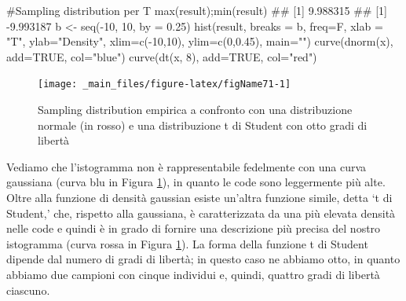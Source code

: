 \documentclass[a4paper,12pt,oneside]{book}
\newenvironment{Shaded}{\begin{snugshade}}{\end{snugshade}}
\newcommand{\DecValTok}[1]{#1}
\newcommand{\FloatTok}[1]{#1}
\newcommand{\ConstantTok}[1]{#1}
\newcommand{\SpecialCharTok}[1]{#1}
\newcommand{\StringTok}[1]{#1}
\newcommand{\CommentTok}[1]{#1}
\newcommand{\DocumentationTok}[1]{#1}
\newcommand{\OtherTok}[1]{#1}
\newcommand{\FunctionTok}[1]{#1}
\newcommand{\AttributeTok}[1]{#1}
\newcommand{\NormalTok}[1]{#1}
\begin{document}
\begin{Shaded}
\begin{Highlighting}[]
\CommentTok{\#Sampling distribution per T }
\FunctionTok{max}\NormalTok{(result);}\FunctionTok{min}\NormalTok{(result)}
\DocumentationTok{\#\# [1] 9.988315}
\DocumentationTok{\#\# [1] {-}9.993187}
\NormalTok{b }\OtherTok{\textless{}{-}} \FunctionTok{seq}\NormalTok{(}\SpecialCharTok{{-}}\DecValTok{10}\NormalTok{, }\DecValTok{10}\NormalTok{, }\AttributeTok{by =} \FloatTok{0.25}\NormalTok{)}
\FunctionTok{hist}\NormalTok{(result, }\AttributeTok{breaks =}\NormalTok{ b, }\AttributeTok{freq=}\NormalTok{F, }
  \AttributeTok{xlab =} \StringTok{"T"}\NormalTok{, }\AttributeTok{ylab=}\StringTok{"Density"}\NormalTok{, }
  \AttributeTok{xlim=}\FunctionTok{c}\NormalTok{(}\SpecialCharTok{{-}}\DecValTok{10}\NormalTok{,}\DecValTok{10}\NormalTok{), }\AttributeTok{ylim=}\FunctionTok{c}\NormalTok{(}\DecValTok{0}\NormalTok{,}\FloatTok{0.45}\NormalTok{), }\AttributeTok{main=}\StringTok{""}\NormalTok{)}
\FunctionTok{curve}\NormalTok{(}\FunctionTok{dnorm}\NormalTok{(x), }\AttributeTok{add=}\ConstantTok{TRUE}\NormalTok{, }\AttributeTok{col=}\StringTok{"blue"}\NormalTok{)}
\FunctionTok{curve}\NormalTok{(}\FunctionTok{dt}\NormalTok{(x, }\DecValTok{8}\NormalTok{), }\AttributeTok{add=}\ConstantTok{TRUE}\NormalTok{, }\AttributeTok{col=}\StringTok{"red"}\NormalTok{)}
\end{Highlighting}
\end{Shaded}

\begin{figure}

{\centering \texttt{[image: \_main\_files/figure-latex/figName71-1]} 

}

\caption{Sampling distribution empirica a confronto con una distribuzione normale (in rosso) e una distribuzione t di Student con otto gradi di libertà}\label{fig:figName71}
\end{figure}

Vediamo che l'istogramma non è rappresentabile fedelmente con una curva gaussiana (curva blu in Figura \ref{fig:figName71}), in quanto le code sono leggermente più alte. Oltre alla funzione di densità gaussian esiste un'altra funzione simile, detta `t di Student,' che, rispetto alla gaussiana, è caratterizzata da una più elevata densità nelle code e quindi è in grado di fornire una descrizione più precisa del nostro istogramma (curva rossa in Figura \ref{fig:figName71}). La forma della funzione t di Student dipende dal numero di gradi di libertà; in questo caso ne abbiamo otto, in quanto abbiamo due campioni con cinque individui e, quindi, quattro gradi di libertà ciascuno.
\end{document}
